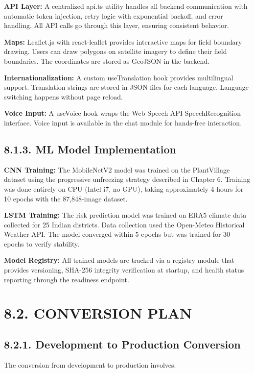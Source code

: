 \documentclass[12pt, a4paper]{report}
\begin{document}
\textbf{API Layer:} A centralized api.ts utility handles all backend communication with automatic token injection, retry logic with exponential backoff, and error handling. All API calls go through this layer, ensuring consistent behavior.

\textbf{Maps:} Leaflet.js with react-leaflet provides interactive maps for field boundary drawing. Users can draw polygons on satellite imagery to define their field boundaries. The coordinates are stored as GeoJSON in the backend.

\textbf{Internationalization:} A custom useTranslation hook provides multilingual support. Translation strings are stored in JSON files for each language. Language switching happens without page reload.

\textbf{Voice Input:} A useVoice hook wraps the Web Speech API SpeechRecognition interface. Voice input is available in the chat module for hands-free interaction.

\subsection{8.1.3. ML Model Implementation}
\textbf{CNN Training:} The MobileNetV2 model was trained on the PlantVillage dataset using the progressive unfreezing strategy described in Chapter 6. Training was done entirely on CPU (Intel i7, no GPU), taking approximately 4 hours for 10 epochs with the 87,848-image dataset.

\textbf{LSTM Training:} The risk prediction model was trained on ERA5 climate data collected for 25 Indian districts. Data collection used the Open-Meteo Historical Weather API. The model converged within 5 epochs but was trained for 30 epochs to verify stability.

\textbf{Model Registry:} All trained models are tracked via a registry module that provides versioning, SHA-256 integrity verification at startup, and health status reporting through the readiness endpoint.

\section{8.2. CONVERSION PLAN}
\subsection{8.2.1. Development to Production Conversion}
The conversion from development to production involves:
\end{document}
